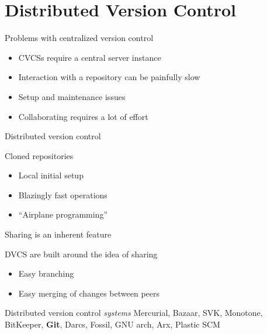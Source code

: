\documentclass[18pt]{beamer}
\begin{document}
\section{Distributed Version Control}

\begin{frame}{Problems with centralized version control}
  \begin{itemize}
    \item CVCSs require a central server instance
    \item Interaction with a repository can be painfully slow
    \item Setup and maintenance issues
    \item Collaborating requires a lot of effort
  \end{itemize}
\end{frame}
\begin{frame}{Distributed version control}
  \begin{block}{Cloned repositories}
    \begin{itemize}
      \item Local initial setup
      \item Blazingly fast operations
      \item \enquote{Airplane programming}
    \end{itemize}
  \end{block}
  \begin{block}{Sharing is an inherent feature}
    \item DVCS are built around the idea of sharing
      \begin{itemize}
        \item Easy branching
        \item Easy merging of changes between peers
      \end{itemize}
  \end{block}
\end{frame}
\begin{frame}{Distributed version control \emph{systems}}
  Mercurial, Bazaar, SVK, Monotone, BitKeeper, \textbf{Git}, Darcs, Fossil, GNU
  arch, Arx, Plastic SCM
\end{frame}
\end{document}
